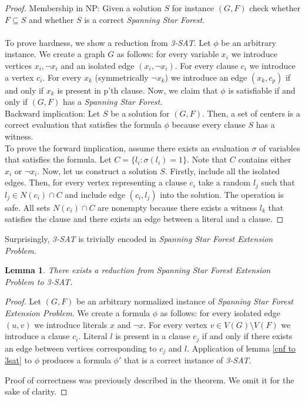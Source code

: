 \documentclass[en]{pracamgr}
\newtheorem{lemma}{Lemma}
\newcommand{\ssf}{\emph{Spanning Star Forest}}
\newcommand{\ssfe}{\emph{Spanning Star Forest Extension Problem}}
\newcommand{\tsat}{\emph{3-SAT}}
\begin{document}
\begin{proof}
	Membership in NP: Given a solution $S$ for instance $(G,F)$ check whether $F \subseteq S$ and whether $S$ is a correct \ssf{}.
	\\\\
	To prove hardness, we show a reduction from \tsat{}. Let $\phi$ be an arbitrary instance. We create a graph $G$ as follows: for every variable $x_i$ we introduce vertices $x_i,\neg x_i$ and an isolated edge $(x_i,\neg x_i)$. For every clause $c_i$ we introduce a vertex $c_i$. For every $x_k$ (symmetrically $\neg x_k$) we introduce an edge $(x_k,c_p)$ if and only if $x_k$ is present in p'th clause. Now, we claim that $\phi$ is satisfiable if and only if $(G, F)$ has a \ssf{}. \\
	Backward implication: Let $S$ be a solution for $(G,F)$. Then, a set of centers is a correct evaluation that satisfies the formula $\phi$ because every clause $S$ has a witness.\\
	To prove the forward implication, assume there exists an evaluation $\sigma$ of variables that satisfies the formula. Let $C = \{l_i: \sigma(l_i) = 1\} $. Note that $C$ contains either $x_i$ or $\neg x_i$. Now, let us construct a solution $S$. Firstly, include all the isolated edges. Then, for every vertex representing a clause $c_i$ take a random $l_j$ such that $l_j \in N(c_i) \cap C$ and include edge $(c_i, l_j)$ into the solution. The operation is safe. All sets $ N(c_i) \cap C$ are nonempty because there exists a witness $l_k$ that satisfies the clause and there exists an edge between a literal and a clause.
\end{proof}

Surprisingly, \tsat{} is trivially encoded in \ssfe{}.

\defi{\tsat}
 \label{cnf to 3sat}
\begin{lemma}
	There exists a reduction from \ssfe{} to \tsat.
\end{lemma}

\begin{proof}
	Let $(G,F)$ be an arbitrary normalized instance of \ssfe{}. We create a formula $\phi$ as follows: for every isolated edge $(u,v)$ we introduce literals $x$ and $\neg x$. For every vertex $v \in V(G)\setminus V(F)$ we introduce a clause $c_i$. Literal $l$ is present in a clause $c_j$ if and only if there exists an edge between vertices corresponding to $c_j$ and $l$. Application of lemma \ref{cnf to 3sat} to $\phi$ produces a formula $\phi'$ that is a correct instance of \tsat.
	
	Proof of correctness was previously described in the theorem. We omit it for the sake of clarity.
\end{proof}
\end{document}
